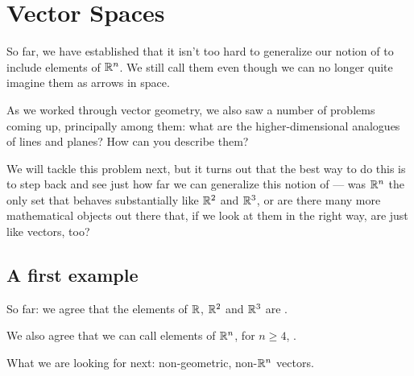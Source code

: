\chapter{Vector Spaces}
\label{chapter:04vectorspaces}

 

So far, we have established that it isn't too hard to generalize
our notion of  to include elements of $\mathbb{R}^n$.  We
still call them  even though we can no longer quite
imagine them as arrows in space.  

As we worked through vector geometry, we also saw
a number of problems coming up, principally among them:
 what are the higher-dimensional
analogues of lines and planes?  How can you describe them?

We will tackle this problem next, but it turns out that the
best way to do this is to step back and see just how far
we can generalize this notion of  --- 
was $\mathbb{R}^n$ the only set that behaves substantially
like $\mathbb{R}^2$ and $\mathbb{R}^3$, or are there many more mathematical
objects out there that, if we look at them in the right
way, are just like vectors, too?

\section{A first example}
So far:  we agree that the elements of  $\mathbb{R}$, $\mathbb{R}^2$ and $\mathbb{R}^3$ are 
.

We also agree that we can call elements of $\mathbb{R}^n$, for $n \geq 4$,
.

What we are looking for next:  non-geometric, non-$\mathbb{R}^n$ vectors.

